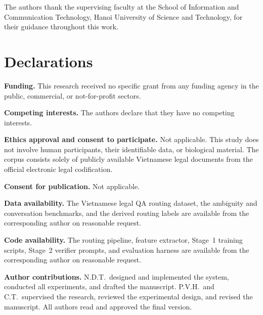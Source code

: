 \backmatter

The authors thank the supervising faculty at the School of Information and
Communication Technology, Hanoi University of Science and Technology, for their
guidance throughout this work.

\section*{Declarations}


\noindent\textbf{Funding.} This research received no specific grant from any
funding agency in the public, commercial, or not-for-profit sectors.

\noindent\textbf{Competing interests.} The authors declare that they have no
competing interests.

\noindent\textbf{Ethics approval and consent to participate.} Not applicable.
This study does not involve human participants, their identifiable data, or
biological material. The corpus consists solely of publicly available
Vietnamese legal documents from the official electronic legal codification.

\noindent\textbf{Consent for publication.} Not applicable.

\noindent\textbf{Data availability.} The Vietnamese legal QA routing dataset,
the ambiguity and conversation benchmarks, and the derived routing labels are
available from the corresponding author on reasonable request.

\noindent\textbf{Code availability.} The routing pipeline, feature extractor,
Stage~1 training scripts, Stage~2 verifier prompts, and evaluation harness are
available from the corresponding author on reasonable request.

\noindent\textbf{Author contributions.} N.D.T.\ designed and implemented the
system, conducted all experiments, and drafted the manuscript. P.V.H.\ and
C.T.\ supervised the research, reviewed the experimental design, and revised
the manuscript. All authors read and approved the final version.
